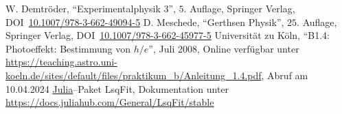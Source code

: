 \documentclass[12pt,a4paper]{scrartcl}
\numberwithin{equation}{section} %
\newcommand{\code}[1]{\textsf{#1}}
\begin{document}
\begin{thebibliography}{99}
	W. Demtröder, ``Experimentalphysik 3'', $5.$ Auflage, Springer Verlag,
	DOI~\href{https://doi.org/10.1007/978-3-662-49094-5}{10.1007/978-3-662-49094-5}
	D. Meschede, ``Gerthsen Physik'', $25.$ Auflage, Springer Verlag,
	DOI~\href{https://doi.org/10.1007/978-3-662-45977-5}{10.1007/978-3-662-45977-5}
	Universität zu Köln, ``B1.4: Photoeffekt: Bestimmung von $h/e$'', Juli 2008,
	Online verfügbar unter \url{https://teaching.astro.uni-koeln.de/sites/default/files/praktikum_b/Anleitung_1.4.pdf},
	Abruf am 10.04.2024
	\code{\href{https://julialang.org}{Julia}}--Paket \code{LsqFit},
	Dokumentation unter \url{https://docs.juliahub.com/General/LsqFit/stable}
\end{thebibliography}
\end{document}
